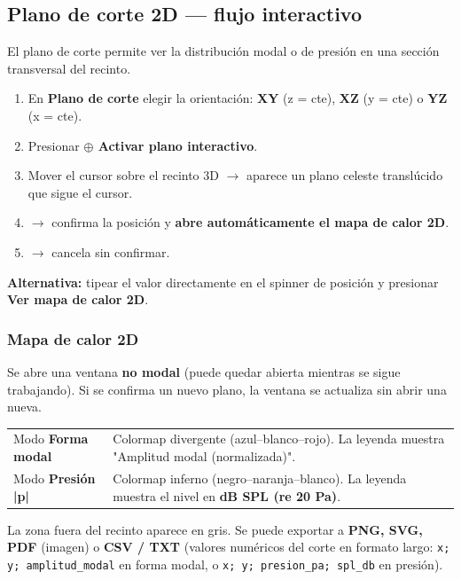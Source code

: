 \documentclass[11pt, a4paper]{article}
\newcommand{\tecla}[1]{\texttt{\small\fbox{#1}}}
\newcommand{\menu}[1]{\textbf{\guillemotleft #1\guillemotright}}
\begin{document}
\subsection{Plano de corte 2D — flujo interactivo}

El plano de corte permite ver la distribución modal o de presión en una
sección transversal del recinto.

\begin{enumerate}[itemsep=4pt]
  \item En \menu{Plano de corte} elegir la orientación:
        \textbf{XY} (z = cte), \textbf{XZ} (y = cte) o \textbf{YZ} (x = cte).
  \item Presionar \textbf{\menu{$\oplus$ Activar plano interactivo}}.
  \item Mover el cursor sobre el recinto 3D $\to$ aparece un plano celeste
        translúcido que sigue el cursor.
  \item \tecla{Clic izquierdo} $\to$ confirma la posición y \textbf{abre automáticamente
        el mapa de calor 2D}.
  \item \tecla{Clic derecho} $\to$ cancela sin confirmar.
\end{enumerate}

\textbf{Alternativa:} tipear el valor directamente en el spinner de posición
y presionar \menu{Ver mapa de calor 2D}.

\subsubsection{Mapa de calor 2D}

Se abre una ventana \textbf{no modal} (puede quedar abierta mientras se sigue
trabajando). Si se confirma un nuevo plano, la ventana se actualiza sin abrir
una nueva.

\begin{tabular}{lp{9cm}}
  \toprule
  Modo \menu{Forma modal} &
    Colormap divergente (azul–blanco–rojo). La leyenda muestra "Amplitud
    modal (normalizada)". \\
  Modo \menu{Presión |p|} &
    Colormap inferno (negro–naranja–blanco). La leyenda muestra el nivel en
    \textbf{dB SPL (re 20 \textmu{}Pa)}. \\
  \bottomrule
\end{tabular}

La zona fuera del recinto aparece en gris. Se puede exportar a
\textbf{PNG, SVG, PDF} (imagen) o \textbf{CSV / TXT} (valores numéricos
del corte en formato largo: \texttt{x; y; amplitud\_modal} en forma modal,
o \texttt{x; y; presion\_pa; spl\_db} en presión).
\end{document}
